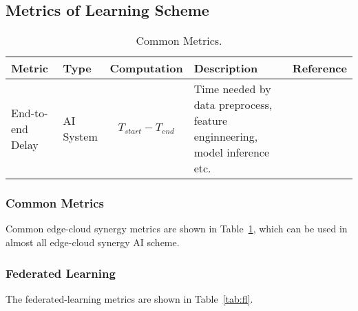 \subsection{Metrics of Learning Scheme}


\begin{table}[ht]
\caption{Common Metrics.} 
\label{tab:common}
\begin{tabular}{|l|l|p{3cm}|p{4cm}|p{4cm}|}
\hline
Metric                 & Type      & Computation & Description                                                                & Reference \\ \hline
End-to-end Delay
& AI System 
& 
\parbox{3cm}{
    \begin{equation} \label{equ:ed} 
    T_{start} - T_{end}
    \end{equation}
}
& Time needed by data preprocess, feature enginneering, model inference etc. 
&           
\\ \hline

\end{tabular}
\end{table}



\subsubsection{Common Metrics}
Common edge-cloud synergy metrics are shown in Table~\ref{tab:common}, which can be used in almost all edge-cloud synergy AI scheme.

\subsubsection{Federated Learning}

The federated-learning metrics are shown in Table~\ref{tab:fl}.



